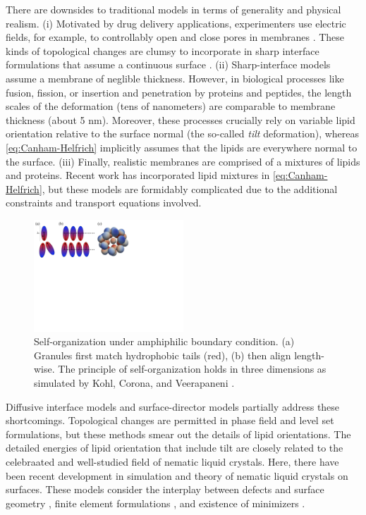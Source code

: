There are downsides to traditional models in terms of generality and physical realism.
(i) Motivated by drug delivery applications, experimenters use electric
fields, for example, to controllably open and close pores in membranes
\cite{}.
These kinds of topological changes are clumsy to incorporate in
sharp interface formulations that assume a continuous surface \cite{}.
(ii) Sharp-interface models assume a membrane of neglible thickness. 
However, in biological processes
like fusion, fission, or insertion and penetration by proteins and peptides, 
the length scales of the
deformation (tens of nanometers) are comparable to membrane thickness (about 5 nm).
Moreover, these processes crucially rely on variable lipid
orientation relative to the surface normal (the so-called \emph{tilt}
deformation),
whereas \eqref{eq:Canham-Helfrich} implicitly assumes that the lipids
are everywhere normal to the surface.  
(iii) Finally, realistic membranes are comprised of a mixtures of lipids and proteins.
Recent work \cite{} has incorporated lipid mixtures in \eqref{eq:Canham-Helfrich},
but these models are formidably complicated 
due to the additional constraints and transport equations involved.

\begin{figure}
  \vspace{-5pt}
\centerline{\includegraphics[width=0.5\textwidth]{figures/SA1Figures/AmphiphilicAssembly.pdf}}
  \vspace{-5pt}
\caption{\label{fig:amphiphilic_assembly}
Self-organization under amphiphilic boundary condition.
(a) Granules first match hydrophobic tails (red),
(b) then align length-wise.
The principle of self-organization holds in three dimensions 
as simulated by Kohl, Corona, and Veerapaneni
\cite{koh-cor-che-vee2021}.}
\end{figure}
Diffusive interface models and surface-director models partially address 
these shortcomings. 
Topological changes are permitted in phase field and level set formulations,
but these methods smear out the details of lipid orientations.
The detailed energies of lipid orientation that include tilt are
closely related to the celebraated and well-studied
field of nematic liquid crystals.  Here, there have been recent development
in simulation and theory of nematic liquid crystals on surfaces.
These models consider the interplay between defects and surface geometry \cite{},
finite element formulations \cite{}, and existence of minimizers \cite{}.

